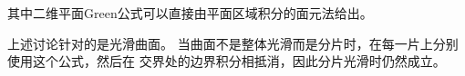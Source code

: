 \documentclass[UTF8,zihao=5]{ctexart}
\newcommand{\bm}[1]{{\mathbf{#1}}}
\newcommand*{\pd}[2]{\frac{\partial #1}{\partial #2}}
\begin{document}
其中二维平面Green公式可以直接由平面区域积分的面元法给出。

上述讨论针对的是光滑曲面。
当曲面不是整体光滑而是分片时，在每一片上分别使用这个公式，然后在
交界处的边界积分相抵消，因此分片光滑时仍然成立。









\end{document}
